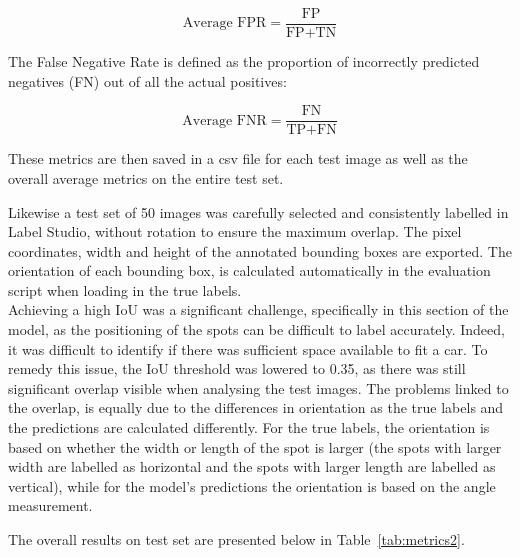 \[
  \text{Average FPR} = \frac{\text{FP}}{\text{FP} + \text{TN}}
\]

The False Negative Rate is defined as the proportion of incorrectly predicted negatives (FN) out of all the actual positives:

\[
  \text{Average FNR} = \frac{\text{FN}}{\text{TP} + \text{FN}}
\]

These metrics are then saved in a csv file for each test image as well as the overall average metrics on the entire test set.

Likewise a test set of 50 images was carefully selected and consistently labelled in Label Studio, without rotation to ensure the maximum overlap. The pixel coordinates, width and height of the annotated bounding boxes are exported. The orientation of each bounding box, is calculated automatically in the evaluation script when loading in the true labels.\\
Achieving a high IoU was a significant challenge, specifically in this section of the model, as the positioning of the spots can be difficult to label accurately. Indeed, it was difficult to identify if there was sufficient space available to fit a car.
To remedy this issue, the IoU threshold was lowered to 0.35, as there was still significant overlap visible when analysing the test images.
The problems linked to the overlap, is equally due to the differences in orientation as the true labels and the predictions are calculated differently.
For the true labels, the orientation is based on whether the width or length of the spot is larger (the spots with larger width are labelled as horizontal and the spots with larger length are labelled as vertical), while for the model's predictions the orientation is based on the angle measurement.

The overall results on test set are presented below in Table~\ref{tab:metrics2}.



